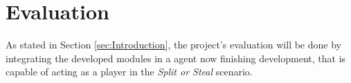 \section{Evaluation}
\label{sec:Evaluation}
As stated in Section \ref{sec:Introduction}, the project's evaluation will be done by integrating the developed modules in a agent now finishing development, that is capable of acting as a player in the \textit{Split or Steal} scenario.
